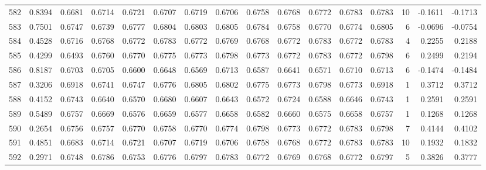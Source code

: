 \begin{tabular}{lrrrrrrrrrrrrrrr}
582 &      0.8394 &  0.6681 &  0.6714 &  0.6721 &  0.6707 &  0.6719 &  0.6706 &  0.6758 &  0.6768 &  0.6772 &   0.6783 &     0.6783 &     10 &                   -0.1611 &                    -0.1713 \\
583 &      0.7501 &  0.6747 &  0.6739 &  0.6777 &  0.6804 &  0.6803 &  0.6805 &  0.6784 &  0.6758 &  0.6770 &   0.6774 &     0.6805 &      6 &                   -0.0696 &                    -0.0754 \\
584 &      0.4528 &  0.6716 &  0.6768 &  0.6772 &  0.6783 &  0.6772 &  0.6769 &  0.6768 &  0.6772 &  0.6783 &   0.6772 &     0.6783 &      4 &                    0.2255 &                     0.2188 \\
585 &      0.4299 &  0.6493 &  0.6760 &  0.6770 &  0.6775 &  0.6773 &  0.6798 &  0.6773 &  0.6772 &  0.6783 &   0.6772 &     0.6798 &      6 &                    0.2499 &                     0.2194 \\
586 &      0.8187 &  0.6703 &  0.6705 &  0.6600 &  0.6648 &  0.6569 &  0.6713 &  0.6587 &  0.6641 &  0.6571 &   0.6710 &     0.6713 &      6 &                   -0.1474 &                    -0.1484 \\
587 &      0.3206 &  0.6918 &  0.6741 &  0.6747 &  0.6776 &  0.6805 &  0.6802 &  0.6775 &  0.6773 &  0.6798 &   0.6773 &     0.6918 &      1 &                    0.3712 &                     0.3712 \\
588 &      0.4152 &  0.6743 &  0.6640 &  0.6570 &  0.6680 &  0.6607 &  0.6643 &  0.6572 &  0.6724 &  0.6588 &   0.6646 &     0.6743 &      1 &                    0.2591 &                     0.2591 \\
589 &      0.5489 &  0.6757 &  0.6669 &  0.6576 &  0.6659 &  0.6577 &  0.6658 &  0.6582 &  0.6660 &  0.6575 &   0.6658 &     0.6757 &      1 &                    0.1268 &                     0.1268 \\
590 &      0.2654 &  0.6756 &  0.6757 &  0.6770 &  0.6758 &  0.6770 &  0.6774 &  0.6798 &  0.6773 &  0.6772 &   0.6783 &     0.6798 &      7 &                    0.4144 &                     0.4102 \\
591 &      0.4851 &  0.6683 &  0.6714 &  0.6721 &  0.6707 &  0.6719 &  0.6706 &  0.6758 &  0.6768 &  0.6772 &   0.6783 &     0.6783 &     10 &                    0.1932 &                     0.1832 \\
592 &      0.2971 &  0.6748 &  0.6786 &  0.6753 &  0.6776 &  0.6797 &  0.6783 &  0.6772 &  0.6769 &  0.6768 &   0.6772 &     0.6797 &      5 &                    0.3826 &                     0.3777 \\

\end{tabular}
